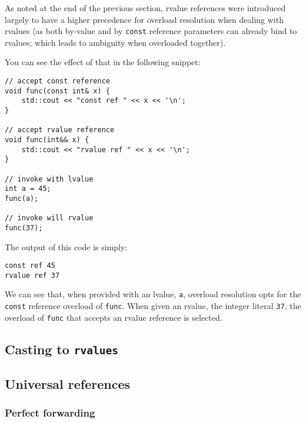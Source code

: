 		As noted at the end of the previous section, rvalue references were
		introduced largely to have a higher precedence for overload resolution
		when dealing with rvalues (as both by-value and by \texttt{const}
		reference parameters can already bind to rvalues; which leads to
		ambiguity when overloaded together).

		You can see the effect of that in the following snippet:

		\begin{verbatim}
// accept const reference
void func(const int& x) {
	std::cout << "const ref " << x << '\n';
}

// accept rvalue reference
void func(int&& x) {
	std::cout << "rvalue ref " << x << '\n';
}

// invoke with lvalue
int a = 45;
func(a);

// invoke will rvalue
func(37);
		\end{verbatim}

		The output of this code is simply:

		\begin{verbatim}
const ref 45
rvalue ref 37
		\end{verbatim}

		We can see that, when provided with an lvalue, \texttt{a}, overload
		resolution opts for the \texttt{const} reference overload of
		\texttt{func}. When given an rvalue, the integer literal \texttt{37},
		the overload of \texttt{func} that accepts an rvalue reference is
		selected. 
		

	\subsection{Casting to \texttt{rvalues}}

	\subsection{Universal references}
		\subsubsection{Perfect forwarding}
